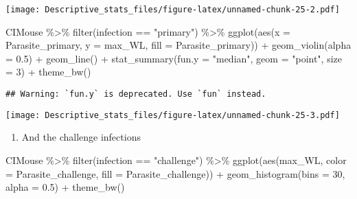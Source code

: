 \documentclass[
]{article}
\newenvironment{Shaded}{\begin{snugshade}}{\end{snugshade}}
\newcommand{\AttributeTok}[1]{\textcolor[rgb]{0.77,0.63,0.00}{#1}}
\newcommand{\DecValTok}[1]{\textcolor[rgb]{0.00,0.00,0.81}{#1}}
\newcommand{\FloatTok}[1]{\textcolor[rgb]{0.00,0.00,0.81}{#1}}
\newcommand{\FunctionTok}[1]{\textcolor[rgb]{0.00,0.00,0.00}{#1}}
\newcommand{\NormalTok}[1]{#1}
\newcommand{\SpecialCharTok}[1]{\textcolor[rgb]{0.00,0.00,0.00}{#1}}
\newcommand{\StringTok}[1]{\textcolor[rgb]{0.31,0.60,0.02}{#1}}
\providecommand{\tightlist}{%
  \setlength{\itemsep}{0pt}\setlength{\parskip}{0pt}}
\begin{document}
\texttt{[image: Descriptive\_stats\_files/figure-latex/unnamed-chunk-25-2.pdf]}

\begin{Shaded}
\begin{Highlighting}[]
\NormalTok{CIMouse  }\SpecialCharTok{\%\textgreater{}\%}
    \FunctionTok{filter}\NormalTok{(infection }\SpecialCharTok{==} \StringTok{"primary"}\NormalTok{)  }\SpecialCharTok{\%\textgreater{}\%}
  \FunctionTok{ggplot}\NormalTok{(}\FunctionTok{aes}\NormalTok{(}\AttributeTok{x =}\NormalTok{ Parasite\_primary, }\AttributeTok{y =}\NormalTok{ max\_WL, }\AttributeTok{fill =}\NormalTok{ Parasite\_primary)) }\SpecialCharTok{+}
  \FunctionTok{geom\_violin}\NormalTok{(}\AttributeTok{alpha =} \FloatTok{0.5}\NormalTok{) }\SpecialCharTok{+}
    \FunctionTok{geom\_line}\NormalTok{() }\SpecialCharTok{+}
     \FunctionTok{stat\_summary}\NormalTok{(}\AttributeTok{fun.y =} \StringTok{"median"}\NormalTok{, }\AttributeTok{geom =} \StringTok{"point"}\NormalTok{, }\AttributeTok{size =} \DecValTok{3}\NormalTok{) }\SpecialCharTok{+}
    \FunctionTok{theme\_bw}\NormalTok{() }
\end{Highlighting}
\end{Shaded}

\begin{verbatim}
## Warning: `fun.y` is deprecated. Use `fun` instead.
\end{verbatim}

\texttt{[image: Descriptive\_stats\_files/figure-latex/unnamed-chunk-25-3.pdf]}

\begin{enumerate}
\def\labelenumi{\arabic{enumi}.}
\setcounter{enumi}{1}
\tightlist
\item
  And the challenge infections
\end{enumerate}

\begin{Shaded}
\begin{Highlighting}[]
\NormalTok{CIMouse }\SpecialCharTok{\%\textgreater{}\%}
    \FunctionTok{filter}\NormalTok{(infection }\SpecialCharTok{==} \StringTok{"challenge"}\NormalTok{)  }\SpecialCharTok{\%\textgreater{}\%}
  \FunctionTok{ggplot}\NormalTok{(}\FunctionTok{aes}\NormalTok{(max\_WL, }\AttributeTok{color =}\NormalTok{ Parasite\_challenge, }\AttributeTok{fill =}\NormalTok{ Parasite\_challenge)) }\SpecialCharTok{+}
  \FunctionTok{geom\_histogram}\NormalTok{(}\AttributeTok{bins =} \DecValTok{30}\NormalTok{, }\AttributeTok{alpha =} \FloatTok{0.5}\NormalTok{) }\SpecialCharTok{+}
    \FunctionTok{theme\_bw}\NormalTok{()}
\end{Highlighting}
\end{Shaded}
\end{document}
